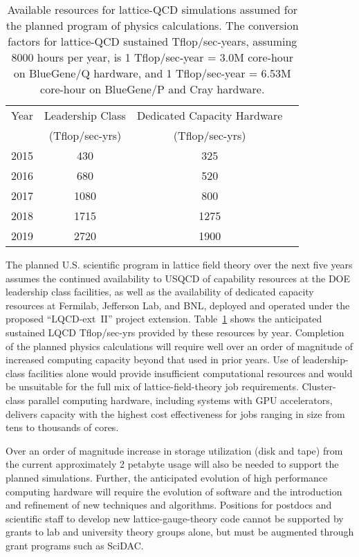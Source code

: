 \begin{table}[t]
\begin{center}
\caption{Available resources for lattice-QCD simulations assumed for the
planned program of physics calculations.  The conversion factors for
lattice-QCD sustained Tflop/sec-years, assuming 8000 hours per year, is 1
Tflop/sec-year = 3.0M core-hour on BlueGene/Q hardware, and 1 Tflop/sec-year =
6.53M core-hour on BlueGene/P and Cray hardware. \vspace{1.5mm}}
\label{tab:fiveyear}
\begin{tabular}{lccc}
\hline\hline  
Year & Leadership Class  & Dedicated Capacity Hardware  \\[-0.75mm] 
& (Tflop/sec-yrs) & (Tflop/sec-yrs) \\[0.5mm] \hline
2015 & 430 & 325 \\
2016 & 680 & 520 \\
2017 & 1080 & 800 \\
2018 & 1715 & 1275 \\ 
2019 & 2720 & 1900 \\ \hline\hline
\end{tabular}
\label{tab:fiveyear}
\end{center}
\end{table}
  
The planned U.S. scientific program in lattice field theory over the next
five years assumes the continued availability to USQCD of capability resources
at the DOE leadership class facilities, as well as the availability of
dedicated capacity resources at Fermilab, Jefferson Lab, and BNL, deployed and
operated under the proposed ``LQCD-ext~II'' project extension.  Table~\ref{tab:fiveyear}
shows the anticipated sustained LQCD Tflop/sec-yrs provided by these resources
by year.  Completion of the planned physics calculations will require well
over an order of magnitude of increased computing capacity beyond that used in
prior years.  Use of leadership-class facilities alone would provide
insufficient computational resources and would be unsuitable for the full mix
of lattice-field-theory job requirements.  Cluster-class parallel computing
hardware, including systems with GPU accelerators, delivers capacity with the
highest cost effectiveness for jobs ranging in size from tens to thousands of
cores.

Over an order of magnitude increase in storage utilization (disk and tape)
from the current approximately 2 petabyte usage will also be needed to support
the planned simulations.  Further, the anticipated evolution of high
performance computing hardware will require the evolution of software and the
introduction and refinement of new techniques and algorithms.  Positions for
postdocs and scientific staff to develop new lattice-gauge-theory code cannot
be supported by grants to lab and university theory groups alone, but must be
augmented through grant programs such as SciDAC.

